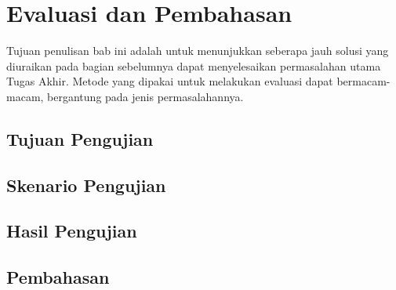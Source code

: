 \chapter{Evaluasi dan Pembahasan}

Tujuan penulisan bab ini adalah untuk menunjukkan seberapa jauh solusi yang diuraikan pada bagian sebelumnya dapat menyelesaikan permasalahan utama Tugas Akhir. Metode yang dipakai untuk melakukan evaluasi dapat bermacam-macam, bergantung pada jenis permasalahannya.

\section{Tujuan Pengujian}
\blindtext

\section{Skenario Pengujian}
\blindtext

\section{Hasil Pengujian}
\blindtext

\section{Pembahasan}
\blindtext